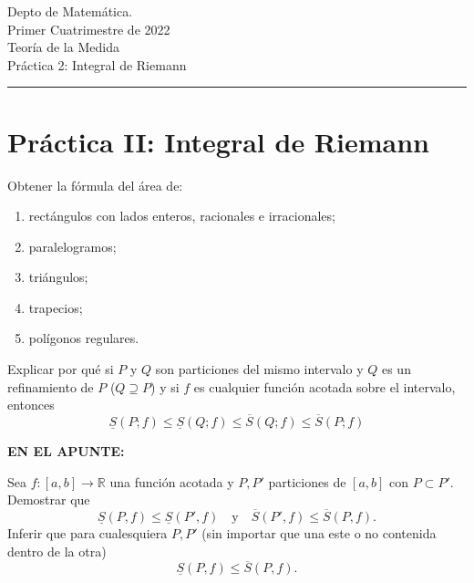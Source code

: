 \documentclass{book}
\begin{document}


\begin{large}
\begin{bfseries} %
        \noindent Depto de Matem\'atica.\\
        Primer Cuatrimestre de 2022\\                                                                                                                                                                                                                                                                                                                                                
        Teoría de la Medida \\
        Práctica 2: Integral de Riemann

\end{bfseries}
\end{large}
\par\noindent\rule{\textwidth}{.5pt}




\section{Práctica II: Integral de Riemann}

\begin{ejer}{} Obtener la fórmula del área de: 
\begin{enumerate}
\item rectángulos con lados  enteros, racionales  e irracionales; 
\item paralelogramos; 
\item triángulos; 
\item trapecios; 
\item polígonos regulares.
\end{enumerate}
\end{ejer}

\begin{ejer}{}  Explicar por qué si $P$ y $Q$ son particiones del mismo intervalo y $Q$ es un refinamiento de $P$
($Q\supseteq P$) y si $f$ es cualquier función acotada sobre el intervalo, entonces
\[
\underline{S}(P;f)\leq \underline{S}(Q;f)\leq \overline{S}(Q;f)\leq \overline{S}(P;f)
\]

\end{ejer}

 
\textbf{EN EL APUNTE:}
\begin{ejer}{} 
Sea $f:[a,b]\to\mathbb{R}$ una función acotada y $P,P'$ particiones de $[a,b]$ con $P\subset P'$. Demostrar que 
  \[
  \underline{S}(P,f)\leq \underline{S}(P',f)\quad\text{y}\quad \overline{S}(P',f)\leq \overline{S}(P,f).
 \]
 Inferir que para cualesquiera $P,P'$ (sin importar que una este o no contenida dentro de la otra)
   \[
\underline{S}(P,f)\leq \overline{S}(P,f).
 \]


\end{ejer}  
\end{document}
